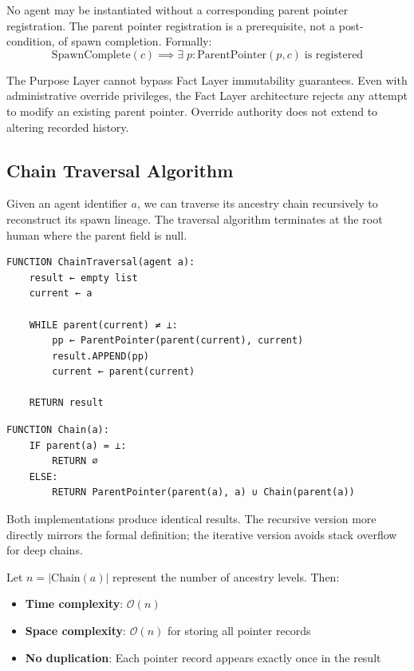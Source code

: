 \begin{invariant}
No agent may be instantiated without a corresponding parent pointer registration. The parent pointer registration is a prerequisite, not a post-condition, of spawn completion. Formally:
\[
\text{SpawnComplete}(c) \implies \exists\; p: \text{ParentPointer}(p, c) \;\text{is registered}
\]
\end{invariant}

The Purpose Layer cannot bypass Fact Layer immutability guarantees. Even with administrative override privileges, the Fact Layer architecture rejects any attempt to modify an existing parent pointer. Override authority does not extend to altering recorded history.

\subsection{Chain Traversal Algorithm}

Given an agent identifier $a$, we can traverse its ancestry chain recursively to reconstruct its spawn lineage. The traversal algorithm terminates at the root human where the parent field is null.

\begin{algorithm}
\begin{verbatim}
FUNCTION ChainTraversal(agent a):
    result ← empty list
    current ← a
    
    WHILE parent(current) ≠ ⊥:
        pp ← ParentPointer(parent(current), current)
        result.APPEND(pp)
        current ← parent(current)
    
    RETURN result
\end{verbatim}
\end{algorithm}

\begin{algorithm}
\begin{verbatim}
FUNCTION Chain(a):
    IF parent(a) = ⊥:
        RETURN ∅
    ELSE:
        RETURN ParentPointer(parent(a), a) ∪ Chain(parent(a))
\end{verbatim}
\end{algorithm}

Both implementations produce identical results. The recursive version more directly mirrors the formal definition; the iterative version avoids stack overflow for deep chains.

\begin{complexity}
Let $n = |\text{Chain}(a)|$ represent the number of ancestry levels. Then:
\begin{itemize}
    \item \textbf{Time complexity}: $\mathcal{O}(n)$
    \item \textbf{Space complexity}: $\mathcal{O}(n)$ for storing all pointer records
    \item \textbf{No duplication}: Each pointer record appears exactly once in the result
\end{itemize}
\end{complexity}

